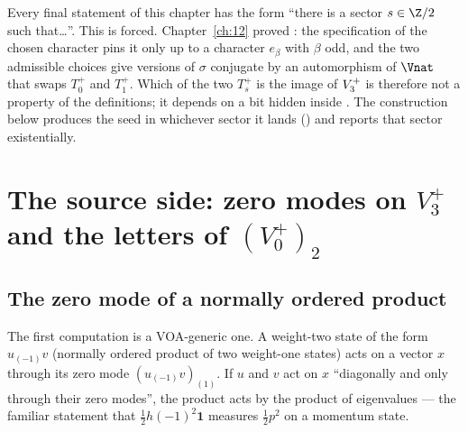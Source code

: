 \begin{remark}\label{ch13:rem:exists-s}
Every final statement of this chapter has the form ``there is a sector $s\in\Z/2$ such that\dots''.
This is forced. Chapter~\ref{ch:12} proved : the specification of the
chosen character  pins it only up to a character $e_\beta$ with $\beta$ odd, and the two
admissible choices give versions of $\sigma$ conjugate by an automorphism of $\Vnat$ that swaps
$T_0^+$ and $T_1^+$. Which of the two $T_s^+$ is the image of $V_3^{+}$ is therefore not a
property of the definitions; it depends on a bit hidden inside . The
construction below produces the seed in whichever sector it lands () and reports
that sector existentially.
\end{remark}

\section{\texorpdfstring{The source side: zero modes on $V_3^+$ and the letters of $(V_0^+)_2$}{The source side: zero modes on V3+ and the letters of (V0+)2}}\label{ch13:sec:source}

\subsection{The zero mode of a normally ordered product}
The first computation is a VOA-generic one. A weight-two state of the form $u_{(-1)}v$ (normally
ordered product of two weight-one states) acts on a vector $x$ through its zero mode
$(u_{(-1)}v)_{(1)}$. If $u$ and $v$ act on $x$ ``diagonally and only through their zero modes'', the
product acts by the product of eigenvalues --- the familiar statement that $\tfrac12 h(-1)^2\mathbf 1$
measures $\tfrac12 p^2$ on a momentum state.

